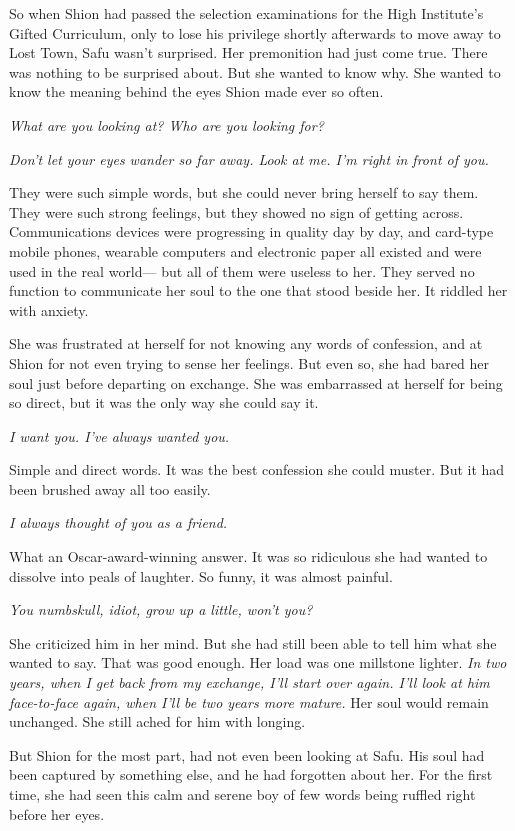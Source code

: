 So when Shion had passed the selection examinations for the High
Institute's Gifted Curriculum, only to lose his privilege shortly
afterwards to move away to Lost Town, Safu wasn't surprised. Her
premonition had just come true. There was nothing to be surprised about.
But she wanted to know why. She wanted to know the meaning behind the
eyes Shion made ever so often.

\emph{What are you looking at? Who are you looking for?}

\emph{Don't let your eyes wander so far away. Look at me. I'm right in front
of you.}

They were such simple words, but she could never bring herself to say
them. They were such strong feelings, but they showed no sign of getting
across. Communications devices were progressing in quality day by day,
and card-type mobile phones, wearable computers and electronic paper all
existed and were used in the real world--- but all of them were useless to
her. They served no function to communicate her soul to the one that
stood beside her. It riddled her with anxiety.

She was frustrated at herself for not knowing any words of confession,
and at Shion for not even trying to sense her feelings. But even so, she
had bared her soul just before departing on exchange. She was
embarrassed at herself for being so direct, but it was the only way she
could say it.

\emph{I want you. I've always wanted you.}

Simple and direct words. It was the best confession she could muster.
But it had been brushed away all too easily.

\emph{I always thought of you as a friend.}

What an Oscar-award-winning answer. It was so ridiculous she had wanted
to dissolve into peals of laughter. So funny, it was almost painful.

\emph{You numbskull, idiot, grow up a little, won't you?}

She criticized him in her mind. But she had still been able to tell him
what she wanted to say. That was good enough. Her load was one millstone
lighter. \emph{In two years, when I get back from my exchange, I'll start over
again. I'll look at him face-to-face again, when I'll be two years more
mature.} Her soul would remain unchanged. She still ached for him with
longing.

But Shion for the most part, had not even been looking at Safu. His soul
had been captured by something else, and he had forgotten about her. For
the first time, she had seen this calm and serene boy of few words being
ruffled right before her eyes.

